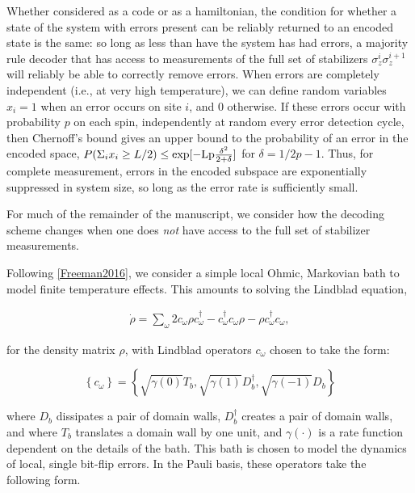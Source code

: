 \documentclass[twocolumn,superscriptaddress,aps,prb,floatfix]{revtex4-1}
\begin{document}
Whether considered as a code or as a hamiltonian, the condition for whether a state of the system with errors present can be reliably returned to an encoded state is the same: so long as less than have the system has had errors, a majority rule decoder that has access to measurements of the full set of stabilizers ${\sigma^i_z \sigma^{i+1}_z}$ will reliably be able to correctly remove errors.  When errors are completely independent (i.e., at very high temperature), we can define random variables $x_i=1$ when an error occurs on site $i$, and $0$ otherwise.  If these errors occur with probability $p$ on each spin, independently at random every error detection cycle, then Chernoff's bound gives an upper bound to the probability of an error in the encoded space, $P(\Sigma_i x_i \geq L/2) \leq \rm{exp}[-Lp\frac{\delta^2}{2+\delta}]$ for $\delta=1/2p-1$.  Thus, for complete measurement, errors in the encoded subspace are exponentially suppressed in system size, so long as the error rate is sufficiently small.

For much of the remainder of the manuscript, we consider how the decoding scheme changes when one does \emph{not} have access to the full set of stabilizer measurements.

Following \ref{Freeman2016}, we consider a simple local Ohmic, Markovian bath to model finite temperature effects.  This amounts to solving the Lindblad equation,

\begin{align}
\dot{\rho }=\sum_{\omega }{2c_{\omega }\rho c^{\dagger }_\omega}-c^{\dagger }_{\omega }c_{\omega }\rho -\rho c^{\dagger }_{\omega }c_{\omega }, \label{eq:Lindblad}
\end{align}

for the density matrix $\rho$, with Lindblad operators $c_{\omega }$ chosen to take the form:

\begin{equation}
\left \{ c_\omega \right \} = \left \{ \sqrt{\gamma(0)} T_{b}, \sqrt{\gamma(1)} D^\dagger_{b}, \sqrt{\gamma(-1)} D_{b} \right\} 
\end{equation}

where $D_{b}$ dissipates a pair of domain walls,  $D^\dagger_{b}$ creates a pair of domain walls, and where $T_{b}$ translates a domain wall by one unit, and $\gamma(\cdot)$ is a rate function dependent on the details of the bath.  This bath is chosen to model the dynamics of local, single bit-flip errors.  In the Pauli basis, these operators take the following form.
\end{document}
